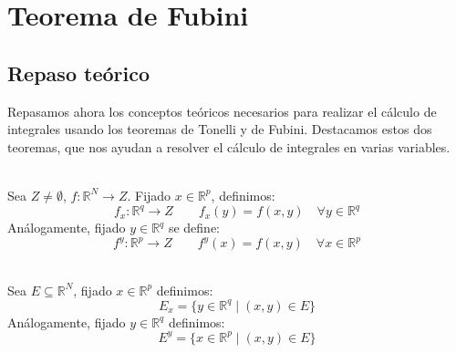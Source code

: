 \section{Teorema de Fubini}

\subsection{Repaso teórico}
Repasamos ahora los conceptos teóricos necesarios para realizar el cálculo de integrales usando los teoremas de Tonelli y de Fubini. Destacamos estos dos teoremas, que nos ayudan a resolver el cálculo de integrales en varias variables.

\begin{definicion}\ \\
    Sea $Z\neq \emptyset $, $f:\mathbb{R}^N\to Z$. Fijado $x\in \mathbb{R}^p$, definimos:
    \begin{equation*}
        f_x:\mathbb{R}^q \to Z \qquad f_x(y) = f(x,y)\quad \forall y\in \mathbb{R}^q
    \end{equation*}
    Análogamente, fijado $y\in \mathbb{R}^q$ se define:
    \begin{equation*}
        f^y:\mathbb{R}^p \to Z \qquad f^y(x) = f(x,y)\quad \forall x\in \mathbb{R}^p
    \end{equation*}
\end{definicion}

\begin{definicion}\ \\
    Sea $E\subseteq \mathbb{R}^N$, fijado $x\in \mathbb{R}^p$ definimos:
    \begin{equation*}
        E_x = \{y\in \mathbb{R}^q \mid (x,y)\in E\}
    \end{equation*}
    Análogamente, fijado $y\in \mathbb{R}^q$ definimos:
    \begin{equation*}
        E^y = \{x \in \mathbb{R}^p \mid (x,y)\in E\}
    \end{equation*}
\end{definicion}

